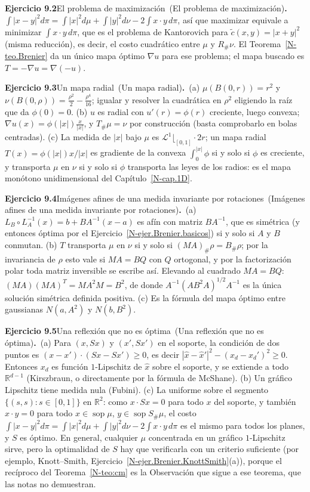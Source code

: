 \documentclass[11pt,a4paper]{amsart}
\def\sop{\operatorname {\mathrm{sop}}}
\newcommand{\R}{{\mathbb R}}
\newcommand{\LL}{{\mathcal L}}
\theoremstyle{remark}
\theoremstyle{definition}
\numberwithin{subsection}{section}
\numberwithin{equation}{section}
\newcommand{\ejlabel}[2]{\par\medskip\noindent\textbf{Ejercicio #1}\ifx\relax#2\relax\else\ (#2)\fi\textbf{.}\ }
\begin{document}
\ejlabel{9.2}{El problema de maximización}$\int|x-y|^2d\pi=\int|x|^2d\mu+\int|y|^2d\nu-2\int x\cdot y\,d\pi$, así que maximizar equivale a minimizar $\int x\cdot y\,d\pi$, que es el problema de Kantorovich para $\tilde c(x,y)=|x+y|^2$ (misma reducción), es decir, el costo cuadrático entre $\mu$ y $R_\#\nu$. El Teorema~\ref{N-teo.Brenier} da un único mapa óptimo $\nabla u$ para ese problema; el mapa buscado es $T=-\nabla u=\nabla(-u)$.

\ejlabel{9.3}{Un mapa radial}(a) $\mu(B(0,r))=r^2$ y $\nu(B(0,\rho))=\frac{\rho^2}2-\frac{\rho^4}{16}$; igualar y resolver la cuadrática en $\rho^2$ eligiendo la raíz que da $\phi(0)=0$. (b) $u$ es radial con $u'(r)=\phi(r)$ creciente, luego convexa; $\nabla u(x)=\phi(|x|)\frac x{|x|}$, y $T_\#\mu=\nu$ por construcción (basta comprobarlo en bolas centradas). (c) La medida de $|x|$ bajo $\mu$ es $\LL^1\lfloor_{[0,1]}\cdot 2r$; un mapa radial $T(x)=\phi(|x|)x/|x|$ es gradiente de la convexa $\int_0^{|x|}\phi$ si y solo si $\phi$ es creciente, y transporta $\mu$ en $\nu$ si y solo si $\phi$ transporta las leyes de los radios: es el mapa monótono unidimensional del Capítulo~\ref{N-cap.1D}.

\ejlabel{9.4}{Imágenes afines de una medida invariante por rotaciones}(a) $L_B\circ L_A^{-1}(x)=b+BA^{-1}(x-a)$ es afín con matriz $BA^{-1}$, que es simétrica (y entonces óptima por el Ejercicio~\ref{N-ejer.Brenier.basicos}) si y solo si $A$ y $B$ conmutan. (b) $T$ transporta $\mu$ en $\nu$ si y solo si $(MA)_\#\rho=B_\#\rho$; por la invariancia de $\rho$ esto vale si $MA=BQ$ con $Q$ ortogonal, y por la factorización polar toda matriz inversible se escribe así. Elevando al cuadrado $MA=BQ$: $(MA)(MA)^T=MA^2M=B^2$, de donde $A^{-1}(AB^2A)^{1/2}A^{-1}$ es la única solución simétrica definida positiva. (c) Es la fórmula del mapa óptimo entre gaussianas $N(a,A^2)$ y $N(b,B^2)$.

\ejlabel{9.5}{Una reflexión que no es óptima}(a) Para $(x,Sx)$ y $(x',Sx')$ en el soporte, la condición de dos puntos es $(x-x')\cdot(Sx-Sx')\ge0$, es decir $|\hat x-\hat x'|^2-(x_d-x_d')^2\ge0$. Entonces $x_d$ es función $1$-Lipschitz de $\hat x$ sobre el soporte, y se extiende a todo $\R^{d-1}$ (Kirszbraun, o directamente por la fórmula de McShane). (b) Un gráfico Lipschitz tiene medida nula (Fubini). (c) La uniforme sobre el segmento $\{(s,s):s\in[0,1]\}$ en $\R^2$: como $x\cdot Sx=0$ para todo $x$ del soporte, y también $x\cdot y=0$ para todo $x\in\sop\mu$, $y\in\sop S_\#\mu$, el costo $\int|x-y|^2d\pi=\int|x|^2d\mu+\int|y|^2d\nu-2\int x\cdot y\,d\pi$ es el mismo para todos los planes, y $S$ es óptimo. En general, cualquier $\mu$ concentrada en un gráfico $1$-Lipschitz sirve, pero la optimalidad de $S$ hay que verificarla con un criterio suficiente (por ejemplo, Knott--Smith, Ejercicio~\ref{N-ejer.Brenier.KnottSmith}(a)), porque el recíproco del Teorema~\ref{N-teo:cm} es la Observación que sigue a ese teorema, que las notas no demuestran.
\end{document}
